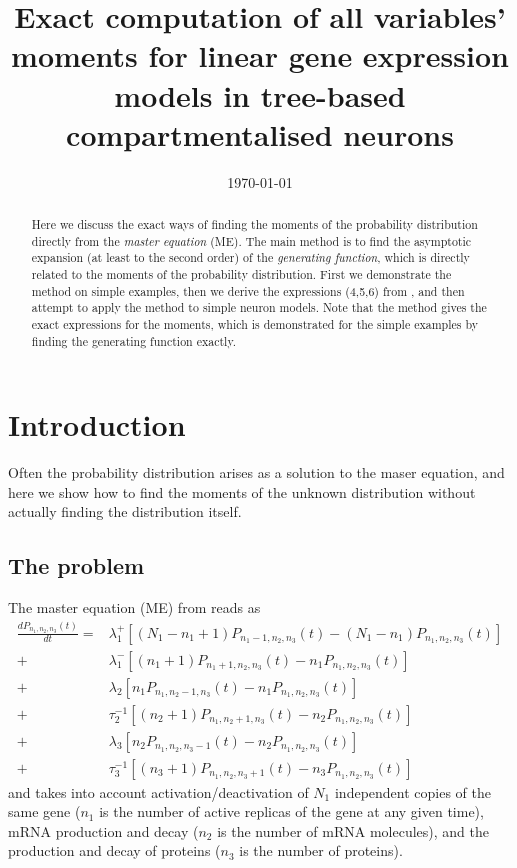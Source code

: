 \documentclass[a4paper, 11pt]{article}
\title{\textbf{Exact computation of all variables' moments for linear gene expression models in tree-based compartmentalised neurons}}
\date{\today}
\begin{document}
\maketitle

\begin{abstract}
  Here we discuss the exact ways of finding the moments of the probability distribution directly from the {\it master equation} (ME). The main method is to find the asymptotic expansion (at least to the second order) of the {\it generating function}, which is directly related to the moments of the probability distribution. First we demonstrate the method on simple examples, then we derive the expressions (4,5,6) from \cite{PAULSSON2005157}, and then attempt to apply the method to simple neuron models. Note that the method gives the exact expressions for the moments, which is demonstrated for the simple examples by finding the generating function exactly.
\end{abstract}

\tableofcontents

\section{Introduction}
Often the probability distribution arises as a solution to the maser equation, and here we show how to find the moments of the unknown distribution without actually finding the distribution itself.
\subsection{The problem}

The master equation (ME) from \cite{PAULSSON2005157} reads as
\begin{equation} \label{full_Paulsson_ME}
  \begin{split} 
    \frac{dP_{n_1,n_2,n_3}(t)}{dt} = &\lambda_1^+\left[(N_1-n_1+1)P_{n_1-1,n_2,n_3}(t) - (N_1-n_1)P_{n_1,n_2,n_3}(t)\right]\\
    + & \lambda_1^-\left[(n_1+1)P_{n_1+1,n_2,n_3}(t) - n_1P_{n_1,n_2,n_3}(t)\right] \\
    + & \lambda_2\left[n_1P_{n_1,n_2-1,n_3}(t) - n_1P_{n_1,n_2,n_3}(t)\right]\\
    + & \tau_2^{-1}\left[(n_2+1)P_{n_1,n_2+1,n_3}(t) - n_2P_{n_1,n_2,n_3}(t)\right]\\
    + & \lambda_3\left[n_2P_{n_1,n_2,n_3-1}(t) - n_2P_{n_1,n_2,n_3}(t)\right]\\
    + & \tau_3^{-1}\left[(n_3+1)P_{n_1,n_2,n_3+1}(t) - n_3P_{n_1,n_2,n_3}(t)\right]
  \end{split}
\end{equation}
and takes into account activation/deactivation of $N_1$ independent copies of the same gene ($n_1$ is the number of active replicas of the gene at any given time), mRNA production and decay ($n_2$ is the number of mRNA molecules), and the production and decay of proteins ($n_3$ is the number of proteins).
\end{document}
